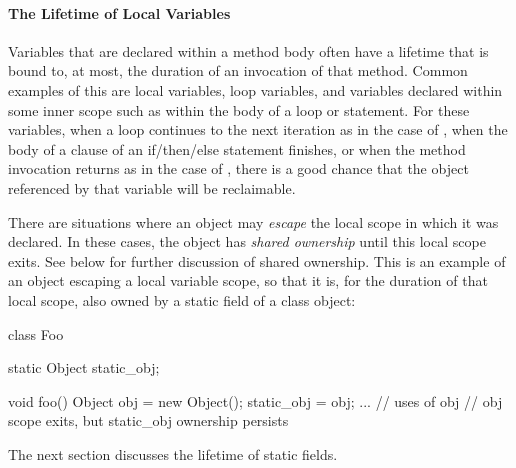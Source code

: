 \paragraph{The Lifetime of Local Variables}
\label{sec:lifetime-of-locals}
Variables that are declared within a method body often have a lifetime that is
bound to, at most, the duration of an invocation of that method.
Common examples of this are local variables, loop variables, and variables
declared within some inner scope such as within the body of a loop or 
statement. For these variables, when a loop continues to the next iteration as in
the case of , when the body of a clause of an
if/then/else statement finishes, or when the method invocation returns as in the
case of , there is a good chance that the object
referenced by that variable will be reclaimable.

There are situations where an object may \emph{escape} the local scope in which
it was declared. In these cases, the object has
\emph{shared ownership} until this local scope exits.
See below for further discussion of shared ownership. This is an example of an
object escaping a local variable scope, so that it is, for the duration of that
local scope, also owned by a static field of a class object:
\begin{shortlisting}
class Foo {
   static Object static_obj;
   
   void foo() {
      Object obj = new Object();
      static_obj = obj;
      ... // uses of obj
   } // obj scope exits, but static_obj ownership persists
}
\end{shortlisting}
The next section discusses the lifetime of static fields.

